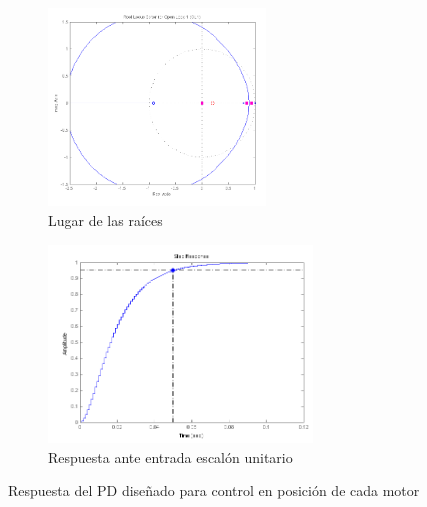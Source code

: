 \begin{figure}[htbp]
\centering
	\begin{subfigure}[h]
		\centering
		\includegraphics[height=5.25cm]{pos-pos-rlocus}
		\caption{Lugar de las raíces}
	\end{subfigure}
	\begin{subfigure}[h]
		\centering
		\includegraphics[height=5.25cm]{pos-pos-step}
		\caption{Respuesta ante entrada escalón unitario}
    \end{subfigure}
	\caption{Respuesta del PD diseñado para control en posición de cada motor}
  	\label{fig:pos-pos-reg}
\end{figure}

